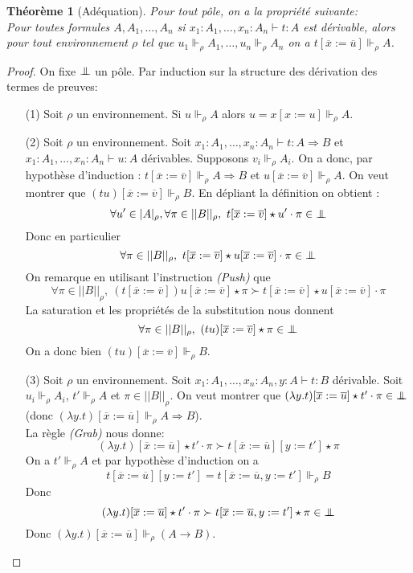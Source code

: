 \documentclass[a4paper,12pt]{article}
\newtheorem{theo}{Théorème}[subsection]
\theoremstyle{rmqstyle}
\newcommand{\abs}[1]{\lvert#1\rvert}
\newcommand{\abss}[1]{\lvert \lvert#1\rvert \rvert}
\renewcommand{\implies}{\Rightarrow}
\newcommand{\pole}{{\protect\mathpalette{\protect\polehelper}{\bot}}} \def\polehelper#1#2{\mathrel{\rlap{$#1#2$}\mkern3mu{#1#2}}}
\renewcommand{\bar}{\overline}
\begin{document}
\begin{theo}[Adéquation]
\label{ade}
Pour tout pôle, on a la propriété suivante:\\
Pour toutes formules $A, A_1, \dots, A_n$ si $x_1 : A_1, \dots, x_n : A_n \vdash t : A$ est dérivable, alors pour tout environnement $\rho$ tel que $u_1 \Vdash_\rho A_1,  \dots, u_n \Vdash_\rho A_n$ on a $t[ \bar{x} := \bar{u}] \Vdash_\rho A$.
\end{theo}

\begin{proof}
On fixe $\pole$ un pôle. Par induction sur la structure des dérivation des termes de preuves:
\begin{itemize}
\setlength\itemsep{ -1 em}
\item[(1)] Soit $\rho$ un environnement. Si $u \Vdash_\rho A$ alors $u = x[x := u] \Vdash_\rho A$.\\

\item[(2)] Soit $\rho$ un environnement. Soit $x_1 : A_1, \dots, x_n : A_n \vdash t : A \implies B$ et $x_1 : A_1, \dots, x_n : A_n \vdash u : A$ dérivables. Supposons $v_i \Vdash_\rho A_i$. On a donc, par hypothèse d'induction : $t[ \bar{x} := \bar{v}] \Vdash_\rho A \implies B$ et $u[\bar{x} := \bar{v}] \Vdash_\rho A$. On veut montrer que $(tu)[\bar{x} := \bar{v}] \Vdash_\rho B$. En dépliant la définition on obtient : 
$$\forall u' \in \abs{A}_\rho, \forall \pi \in \abss{B}_\rho, \ t[\bar{x} := \bar{v}] \star u' \cdot \pi \in \pole$$
Donc en particulier
$$ \forall \pi \in \abss{B}_\rho, \ t[\bar{x} := \bar{v}] \star u[\bar{x} := \bar{v}] \cdot \pi \in \pole$$
On remarque en utilisant l'instruction \textit{(Push)} que 
$$\forall \pi \in \abss{B}_\rho, \ (t[\bar{x} := \bar{v}])u[\bar{x} := \bar{v}] \star \pi \succ t[\bar{x} := \bar{v}] \star u[\bar{x} := \bar{v}] \cdot \pi$$
La saturation et les propriétés de la substitution nous donnent 
$$\forall \pi \in \abss{B}_\rho, \ (tu)[\bar{x} := \bar{v}] \star \pi \in \pole$$
On a donc bien $(tu)[\bar{x} := \bar{v}] \Vdash_\rho B$.\\

\item[(3)] Soit $\rho$ un environnement. Soit $x_1 : A_1, \dots, x_n : A_n, y : A \vdash t : B$ dérivable. Soit $u_i \Vdash_\rho A_i$, $t' \Vdash_\rho A$ et $\pi \in \abss{B}_\rho$. On veut montrer que $(\lambda y.t)[\bar{x} := \bar{u}] \star t' \cdot \pi \in \pole$ (donc $(\lambda y.t)[\bar{x} := \bar{u}] \Vdash_\rho A \implies B$).\\
La règle \textit{(Grab)} nous donne:
$$(\lambda y.t)[\bar{x} := \bar{u}] \star t' \cdot \pi \succ  t[\bar{x} := \bar{u}][y := t'] \star \pi $$
On a $t' \Vdash_\rho A$ et par hypothèse d'induction on a
$$t[\bar{x} := \bar{u}][y := t'] = t[\bar{x} := \bar{u}, y := t'] \Vdash_\rho B$$
Donc
$$(\lambda y.t)[\bar{x} := \bar{u}] \star t' \cdot \pi \succ  t[\bar{x} := \bar{u}, y := t'] \star \pi \in \pole$$
Donc $(\lambda y.t)[\bar{x} := \bar{u}] \Vdash_\rho (A \to B)$.\\


\end{itemize}
\end{proof}
\end{document}
